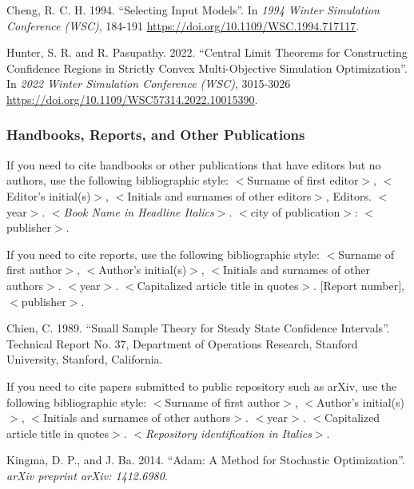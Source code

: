 \documentclass{wscpaperproc}
\theoremstyle{wsc}
\begin{document}
{\sloppy
{\footnotesize
\begin{hangref}
\item Cheng, R. C. H. 1994. ``Selecting Input Models''. In \textit{1994 Winter Simulation Conference (WSC)}, 184-191 \href{https://doi.org/10.1109/WSC.1994.717117}{https://doi.org/10.1109/WSC.1994.717117}.
\item Hunter, S. R. and R. Pasupathy. 2022. ``Central Limit Theorems for Constructing Confidence Regions in Strictly Convex Multi-Objective Simulation Optimization''. In \textit{2022 Winter Simulation Conference (WSC)}, 3015-3026 \href{https://doi.org/10.1109/WSC57314.2022.10015390}{https://doi.org/10.1109/WSC57314.2022.10015390}.
\end{hangref}
}
}

\subsubsection{Handbooks, Reports, and Other Publications}
If you need to cite handbooks or other publications that have editors but no authors, use the following bibliographic style:
$<$Surname of first editor$>$, $<$Editor's initial(s)$>$, $<$Initials and surnames of other editors$>$, Editors.
$<$year$>$. $<${\em Book Name in Headline Italics}$>$. $<$city of publication$>$: $<$publisher$>$.

If you need to cite reports, use the following bibliographic style: $<$Surname of first author$>$, $<$Author's initial(s)$>$, $<$Initials and surnames of other authors$>$. $<$year$>$. $<$Capitalized article title in quotes$>$. $[$Report number$]$, $<$publisher$>$.

{\footnotesize
\begin{hangref}
\item Chien, C. 1989. ``Small Sample Theory for Steady State Confidence Intervals''. Technical Report No. 37, Department of Operations Research, Stanford University, Stanford, California.
\end{hangref}
}

If you need to cite papers submitted to public repository such as arXiv, use the following bibliographic style: $<$Surname of first author$>$, $<$Author's initial(s)$>$, $<$Initials and surnames of other authors$>$. $<$year$>$. $<$Capitalized article title in quotes$>$. $<$\textit{Repository identification in Italics}$>$.

{\footnotesize
\begin{hangref}
\item Kingma, D. P., and J. Ba. 2014. ``Adam: A Method for Stochastic Optimization''. \textit{arXiv preprint arXiv: 1412.6980}.
\end{hangref}
}
\end{document}
